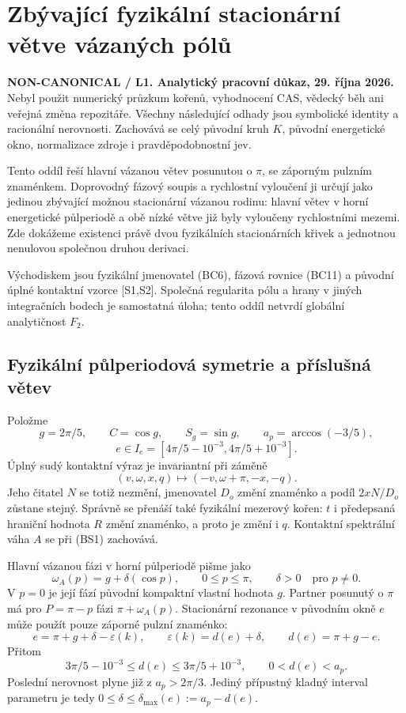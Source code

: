 \documentclass[11pt,a4paper]{article}
\theoremstyle{remark}\newtheorem{remark}[theorem]{Poznámka}
\numberwithin{equation}{section}
\begin{document}
\section{Zbývající fyzikální stacionární větve vázaných pólů}
\label{sec:bound-stationary}

\textbf{NON-CANONICAL / L1. Analytický pracovní důkaz, 29. října 2026.}
Nebyl použit numerický průzkum kořenů, vyhodnocení CAS, vědecký běh ani
veřejná změna repozitáře. Všechny následující odhady jsou symbolické
identity a racionální nerovnosti. Zachovává se celý původní kruh \(K\),
původní energetické okno, normalizace zdroje i pravděpodobnostní jev.

Tento oddíl řeší hlavní vázanou větev posunutou o \(\pi\), se záporným
pulzním znaménkem. Doprovodný fázový soupis a rychlostní vyloučení ji
určují jako jedinou zbývající možnou stacionární vázanou rodinu:
hlavní větev v horní energetické půlperiodě a obě nízké větve již byly
vyloučeny rychlostními mezemi. Zde dokážeme existenci právě dvou
fyzikálních stacionárních křivek a jednotnou nenulovou společnou druhou
derivaci.

Východiskem jsou fyzikální jmenovatel (BC6), fázová rovnice
(BC11) a původní úplné kontaktní vzorce [S1,S2]. Společná regularita
pólu a hrany v jiných integračních bodech je samostatná úloha; tento
oddíl netvrdí globální analytičnost \(F_2\).

\subsection{Fyzikální půlperiodová symetrie a příslušná větev}

Položme
\[
g=2\pi/5,\qquad C=\cos g,\qquad S_g=\sin g,
\qquad a_p=\arccos(-3/5),
\]
\[
e\in I_e=[4\pi/5-10^{-3},4\pi/5+10^{-3}].
\]
Úplný sudý kontaktní výraz je invariantní při záměně
\[
(v,\omega,x,q)\longmapsto(-v,\omega+\pi,-x,-q).
\tag{BS1}
\]
Jeho čitatel \(N\) se totiž nezmění, jmenovatel \(D_o\) změní znaménko
a podíl \(2xN/D_o\) zůstane stejný. Správně se přenáší také fyzikální
mezerový kořen: \(t\) i předepsaná hraniční hodnota \(R\) změní
znaménko, a proto je změní i \(q\). Kontaktní spektrální váha \(A\)
se při (BS1) zachovává.

Hlavní vázanou fázi v horní půlperiodě pišme jako
\[
\omega_A(p)=g+\delta(\cos p),\qquad 0\le p\le\pi,
\qquad \delta>0\quad\text{pro }p\ne0.
\]
V \(p=0\) je její fází původní kompaktní vlastní hodnota \(g\).
Partner posunutý o \(\pi\) má pro \(P=\pi-p\) fázi
\(\pi+\omega_A(p)\). Stacionární rezonance v původním okně \(e\)
může použít pouze záporné pulzní znaménko:
\[
e=\pi+g+\delta-\varepsilon(k),\qquad
\varepsilon(k)=d(e)+\delta,
\qquad d(e)=\pi+g-e.
\tag{BS2}
\]
Přitom
\[
3\pi/5-10^{-3}\le d(e)\le3\pi/5+10^{-3},
\qquad 0<d(e)<a_p.
\tag{BS3}
\]
Poslední nerovnost plyne již z \(a_p>2\pi/3\). Jediný přípustný
kladný interval parametru je tedy
\(0\le\delta\le\delta_{\max}(e):=a_p-d(e)\).
\end{document}
